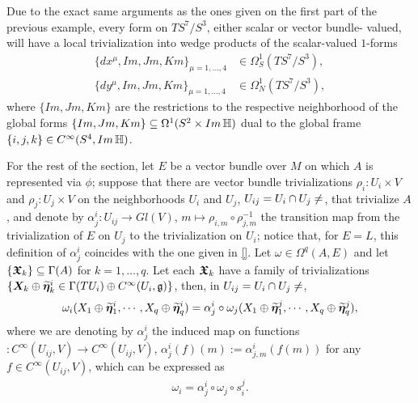 \begin{example}
Due to the exact same arguments as the ones given on the first part of the previous example, every form on $TS^7/S^3$, either scalar or vector bundle- valued, will have a local trivialization into wedge products of the scalar-valued $1$-forms
\begin{align}
    \{dx^\mu, Im, Jm, Km\}_{\mu = 1, \dots, 4} & \in \Omega_S^1(TS^7/S^3), \\ \{dy^\mu, Im, Jm, Km\}_{\mu = 1, \dots, 4} & \in \Omega_N^1(TS^7/S^3),
\end{align}
where $\{Im, Jm, Km \}$ are the restrictions to the respective neighborhood of the global forms $\{Im, Jm, Km\} \subseteq \Omega^1(S^2 \times Im \operatorname{\mathbb{H}})$ dual to the global frame $\{i, j, k\} \in C^\infty(S^4, Im \operatorname{\mathbb{H}})$.
\end{example}

\linea 

For the rest of the section, let $E$ be a vector bundle over $M$ on which $A$ is represented via $\phi$; suppose that there are vector bundle trivializations $\rho_i:U_i \times V$ and $\rho_j: U_j \times V$ on the neighborhoods $U_i$ and $U_j$, $U_{ij} = U_i \inter U_j \neq \empty$, that trivialize $A$, and denote by $\alpha^i_j: U_{ij} \to Gl(V)$, $m \mapsto \rho_{i, m} \circ \rho_{j, m}^{-1}$ the transition map from the trivialization of $E$ on $U_j$ to the trivialization on $U_i$; notice that, for $E = L$, this definition of $\alpha^i_j$ coincides with the one given in \ref{}. Let $\omega \in \Omega^q(A, E)$ and let $\{\bm{\mathfrak{X}}_k\} \subseteq \Gamma(A)$ for $k = 1, \dots, q$. Let each $\bm{\mathfrak{X}}_k$ have a family of trivializations $\{\bm{X}_k \oplus \widetilde{\bm{\eta}}_k^i \in \Gamma(TU_i) \oplus C^\infty(U_i, \mathfrak{g})\}$, then, in $U_{ij} = U_i \inter U_j \neq \empty$, 
\begin{align*}
    \omega_i(X_1 \oplus \widetilde{\bm{\eta}}_1^i, \cdots, X_q \oplus \widetilde{\bm{\eta}}_q^i) = \alpha^i_j \circ \omega_j(X_1 \oplus \widetilde{\bm{\eta}}_1^j, \cdots, X_q \oplus \widetilde{\bm{\eta}}_q^j),
\end{align*}
where we are denoting by $\alpha^i_j$ the induced map on functions $:C^\infty(U_{ij}, V) \to C^\infty(U_{ij}, V)$, $\alpha^i_j(f)(m) := \alpha^i_{j, m}(f(m))$ for any $f \in C^\infty(U_{ij}, V)$, which can be expressed as
\begin{align}
    \omega_i = \alpha^i_j \circ \omega_j \circ s^j_i.
\end{align}


